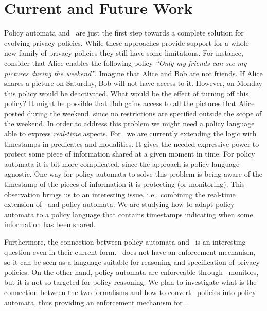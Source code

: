 \vspace{-4mm}
\section{Current and Future Work}

Policy automata and \tfppf~are just the first step towards a complete solution for evolving privacy policies. While these approaches provide support for a whole new family of privacy policies they still have some limitations. For instance, consider that Alice enables the following policy \emph{``Only my friends can see my pictures during the weekend''}. Imagine that Alice and Bob are not friends. If Alice shares a picture on Saturday, Bob will not have access to it. However, on Monday this policy would be deactivated. What would be the effect of turning off this policy? It might be possible that Bob gains access to all the pictures that Alice posted during the weekend, since no restrictions are specified outside the scope of the weekend. In order to address this problem we might need a policy language able to express {\it real-time} aspects. For \tfppf~we are currently extending the logic with timestamps in predicates and modalities. It gives the needed expressive power to protect some piece of information shared at a given moment in time. For policy automata it is bit more complicated, since the approach is policy language agnostic. One way for policy automata to solve this problem is being aware of the timestamp of the pieces of information it is protecting (or monitoring). This observation brings us to an interesting issue, i.e., combining the real-time extension of \tfppf~and policy automata. We are studying how to adapt policy automata to a policy language that contains timestamps indicating when some information has been shared.

Furthermore, the connection between policy automata and \tfppf~is an interesting question even in their current form. \tfppf~does not have an enforcement mechanism, so it can be seen as a language suitable for reasoning and specification of privacy policies. On the other hand, policy automata are enforceable through \larva~monitors, but it is not so targeted for policy reasoning. We plan to investigate what is the connection between the two formalisms and how to convert \tfppf~policies into policy automata, thus providing an enforcement mechanism for \tfppf.
\vspace{-4mm}
